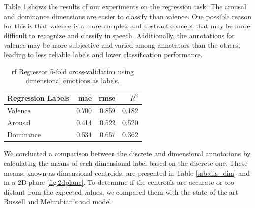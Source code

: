 Table \ref{tab:dim_reg} shows the results of our experiments on the regression task. The arousal and dominance dimensions are easier to classify than valence. One possible reason for this is that valence is a more complex and abstract concept that may be more difficult to recognize and classify in speech. Additionally, the annotations for valence may be more subjective and varied among annotators than the others, leading to less reliable labels and lower classification performance.


\begin{table}[H]
	\centering
	\caption{\ac{rf} Regressor 5-fold cross-validation using dimensional emotions as labels.}
	\label{tab:dim_reg}
	\begin{tabular}{lrrr}
		\toprule
		Regression Labels   &   \ac{mae} &  \ac{rmse} & $R^2$ \\
		\midrule
		Valence             & 0.700 & 0.859 & 0.182 \\
		Arousal             & 0.414 & 0.522 & 0.520 \\
		Dominance           & 0.534 & 0.657 & 0.362 \\
		\bottomrule
	\end{tabular}
\end{table}

We conducted a comparison between the discrete and dimensional annotations by calculating the means of each dimensional label based on the discrete one. These means, known as dimensional centroids, are presented in Table \ref{tab:dis_dim} and in a 2D plane \ref{fig:2dplane}. To determine if the centroids are accurate or too distant from the expected values, we compared them with the state-of-the-art Russell and Mehrabian's \ac{vad} model.

